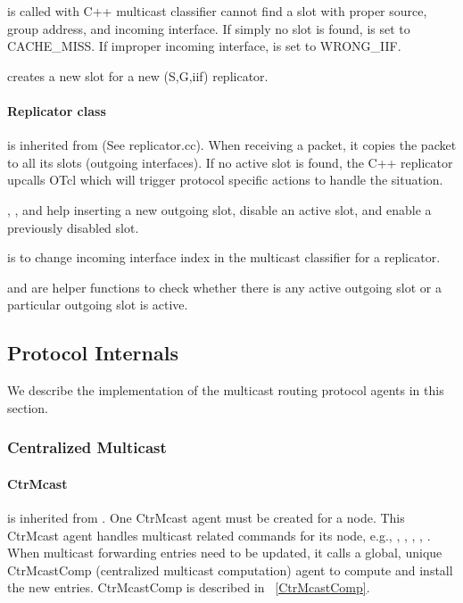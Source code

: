  is called with C++ multicast classifier cannot find a
slot with proper source, group address, and incoming interface.  If simply
no slot is found,  is set to CACHE_MISS.  If improper incoming
interface,  is set to WRONG_IIF.

 creates a new slot for a new (S,G,iif) replicator.


\paragraph{Replicator class}
 is inherited from
 (See replicator.cc).  When receiving a
packet, it copies the packet to all its slots (outgoing interfaces). If no
active slot is found, the C++ replicator upcalls OTcl  which
will trigger protocol specific actions to handle the situation.

, , and  help inserting a new
outgoing slot, disable an active slot, and enable a previously disabled
slot.

 is to change incoming interface index in the multicast
classifier for a replicator.

 and  are helper functions to check whether
there is any active outgoing slot or a particular outgoing slot is active. 

\subsection{Protocol Internals}
\label{sec:mcastproto-internals}

We describe the implementation of the multicast routing protocol agents in
this section.

\subsubsection{Centralized Multicast}

\paragraph{CtrMcast}
\label{CtrMcast}
 is inherited from .  One CtrMcast
agent must be created for a node.  This CtrMcast agent handles multicast
related commands for its node, e.g., ,
, ,
, .  When multicast forwarding
entries need to be updated, it calls a global, unique CtrMcastComp
(centralized multicast computation) agent to compute and install the new
entries.  CtrMcastComp is described in ~\ref{CtrMcastComp}.

